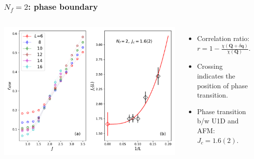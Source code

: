 \documentclass[xcolor=table, 10pt, aspectratio=43]{beamer}
\begin{document}
\begin{frame}
  \frametitle{$N_f=2$: phase boundary}
  \begin{columns}
    \includegraphics[width=\textwidth]{../u1sl/n2rafm}
		\begin{itemize}
			\item Correlation ratio: $r = 1-\frac{\chi(\bm Q+\delta\bm q)}{\chi(\bm Q)}.$
			\item Crossing indicates the position of phase transition.
			\item Phase transition b/w U1D and AFM: $J_c=1.6(2)$.
		\end{itemize}
  \end{columns}
\end{frame}
\end{document}

